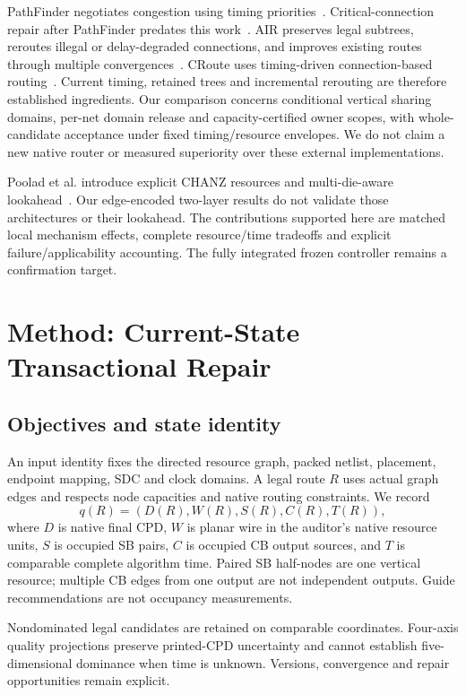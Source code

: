 \documentclass[conference,10pt]{IEEEtran}
\begin{document}
PathFinder negotiates congestion using timing priorities~\cite{pathfinder}. Critical-connection repair after PathFinder predates this work~\cite{liurepair}. AIR preserves legal subtrees, reroutes illegal or delay-degraded connections, and improves existing routes through multiple convergences~\cite{air}. CRoute uses timing-driven connection-based routing~\cite{croute}. Current timing, retained trees and incremental rerouting are therefore established ingredients. Our comparison concerns conditional vertical sharing domains, per-net domain release and capacity-certified owner scopes, with whole-candidate acceptance under fixed timing/resource envelopes. We do not claim a new native router or measured superiority over these external implementations.

Poolad et al. introduce explicit CHANZ resources and multi-die-aware lookahead~\cite{multidie}. Our edge-encoded two-layer results do not validate those architectures or their lookahead. The contributions supported here are matched local mechanism effects, complete resource/time tradeoffs and explicit failure/applicability accounting. The fully integrated frozen controller remains a confirmation target.
\section{Method: Current-State Transactional Repair}
\subsection{Objectives and state identity}
An input identity fixes the directed resource graph, packed netlist, placement, endpoint mapping, SDC and clock domains. A legal route $R$ uses actual graph edges and respects node capacities and native routing constraints. We record
\begin{equation}
 q(R)=(D(R),W(R),S(R),C(R),T(R)),
\end{equation}
where $D$ is native final CPD, $W$ is planar wire in the auditor's native resource units, $S$ is occupied SB pairs, $C$ is occupied CB output sources, and $T$ is comparable complete algorithm time. Paired SB half-nodes are one vertical resource; multiple CB edges from one output are not independent outputs. Guide recommendations are not occupancy measurements.

Nondominated legal candidates are retained on comparable coordinates. Four-axis quality projections preserve printed-CPD uncertainty and cannot establish five-dimensional dominance when time is unknown. Versions, convergence and repair opportunities remain explicit.
\end{document}
